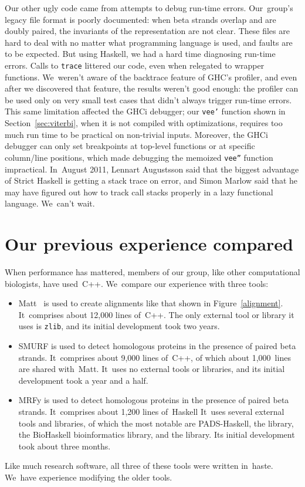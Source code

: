 \documentclass[preprint,nonatbib,blockstyle,nocopyrightspace,times]{sigplanconf}
\newcommand\figref[1]{Figure~\ref{#1}}
\newcommand\secref[1]{Section~\ref{sec:#1}}
\newcommand\seclabel[1]{\label{sec:#1}}
\let\cite\citep
\begin{document}
Our other ugly code came from  attempts to debug
run-time errors.
Our~group's legacy file
format is poorly documented: when beta
strands overlap and are doubly paired, the invariants of the
representation are not clear.
These files are hard to deal with no matter what
programming language is used, and faults are to be expected.
But using Haskell, we had a hard time diagnosing run-time errors.
Calls to
\texttt{trace} 
littered our code,
even when relegated to wrapper functions.
We~weren't aware of the backtrace feature of GHC's profiler,
and even after we discovered that feature, the results weren't good enough:
the profiler can be used only on very small test cases that didn't always trigger
run-time errors.
This same limitation affected the GHCi debugger; our \texttt{vee'} function
shown in \secref{viterbi}, when it is not compiled with
optimizations, requires too much run time to be practical on non-trivial
inputs.
Moreover, the GHCi debugger can only set breakpoints at top-level functions
or at specific column/line positions, which made debugging the memoized
\texttt{vee''} function impractical.
In~August 2011, 
Lennart Augustsson said that the biggest advantage of Strict
Haskell is getting a stack trace on error,
and Simon Marlow said that he may have figured out how to track call
stacks properly in a lazy functional language.
We~can't wait.

 
 
\section{Our previous experience compared}
\seclabel{comparo}

When performance has mattered, members of our group, like other
computational biologists, have used~C++.
We~compare our experience with three tools:
\begin{itemize}
\item
Matt~\cite{Menke:2008wu} is used to create alignments like that shown
in \figref{alignment}.
It~comprises about 12,000 lines of~C++.
The only external tool or library it uses is \texttt{zlib}, and
its initial development took two years.
\item
SMURF
\cite{Menke:2010ti} is used to detect homologous proteins in the presence
of paired beta strands.
It~comprises about 9,000 lines of~C++, of which about 1,000~lines are
shared with~Matt.
It~uses no external tools or libraries, and
its initial development took a year and a half.
\item
MRFy is used to detect homologous proteins in the presence of paired
beta strands.
It~comprises about 1,200 lines of~Haskell
It~uses several external tools and libraries, of which the most
notable are PADS-Haskell, the  library,
the BioHaskell bioinformatics library, and the  library.
Its initial development took about three months.
\end{itemize}
Like much research software, all three of these tools were written
 in~haste.
We~have experience modifying the older tools.
\end{document}
